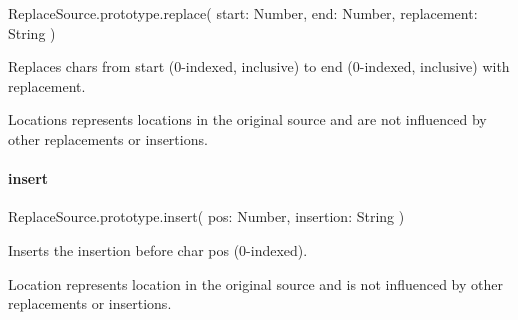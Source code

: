 \begin{DoxyCode}
ReplaceSource.prototype.replace(
    start: Number,
    end: Number,
    replacement: String
)
\end{DoxyCode}


Replaces chars from {\ttfamily start} (0-\/indexed, inclusive) to {\ttfamily end} (0-\/indexed, inclusive) with {\ttfamily replacement}.

Locations represents locations in the original source and are not influenced by other replacements or insertions.

\paragraph*{{\ttfamily insert}}


\begin{DoxyCode}
ReplaceSource.prototype.insert(
    pos: Number,
    insertion: String
)
\end{DoxyCode}


Inserts the {\ttfamily insertion} before char {\ttfamily pos} (0-\/indexed).

Location represents location in the original source and is not influenced by other replacements or insertions. 